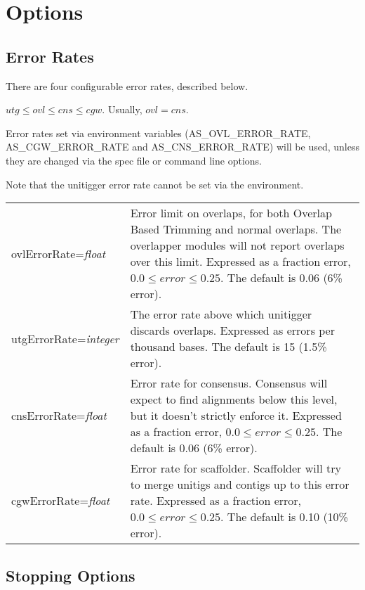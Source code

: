 \documentclass[twoside,11pt]{article}
\begin{document}
\section{Options}

\subsection{Error Rates}
\label{sec:erates}

There are four configurable error rates, described below.

$utg \le ovl \le cns \le cgw$.  Usually, $ovl = cns$.

Error rates set via environment variables (AS\_OVL\_ERROR\_RATE,
AS\_CGW\_ERROR\_RATE and AS\_CNS\_ERROR\_RATE) will be used, unless they are
changed via the spec file or command line options.

Note that the unitigger error rate cannot be set via the environment.

\begin{longtable}{lp{3.0in}}

ovlErrorRate={\it float} &
Error limit on overlaps, for both Overlap Based Trimming and normal
overlaps.  The overlapper modules will not report overlaps over this
limit.
Expressed as a fraction error, $0.0 \le error \le 0.25$.
The default is 0.06 (6\% error).
\\

utgErrorRate={\it integer} &
The error rate above which unitigger discards overlaps.
Expressed as errors per thousand bases.
The default is 15 (1.5\% error).
\\

cnsErrorRate={\it float} &
Error rate for consensus.  Consensus will expect to find alignments
below this level, but it doesn't strictly enforce it.
Expressed as a fraction error, $0.0 \le error \le 0.25$.
The default is 0.06 (6\% error).
\\

cgwErrorRate={\it float} &
Error rate for scaffolder.  Scaffolder will try to merge unitigs and
contigs up to this error rate.
Expressed as a fraction error, $0.0 \le error \le 0.25$.
The default is 0.10 (10\% error).
\\

\end{longtable}


\subsection{Stopping Options}
\label{sec:stopopts}
\end{document}
